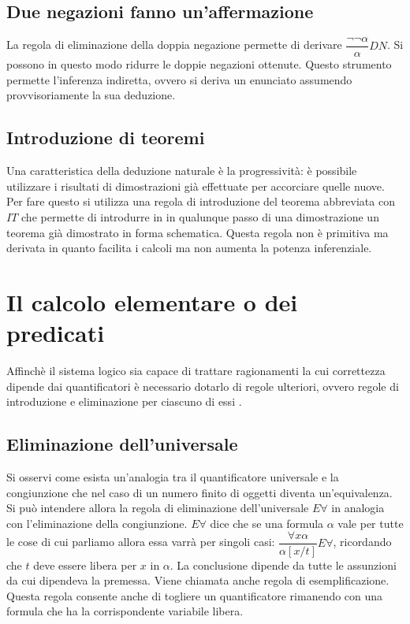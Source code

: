 \subsection{Due negazioni fanno un'affermazione}
La regola di eliminazione della doppia negazione permette di derivare $\dfrac{\neg\neg\alpha}{\alpha}DN$. Si possono in questo modo ridurre le doppie negazioni ottenute. Questo strumento permette 
l'inferenza indiretta, ovvero si deriva un enunciato assumendo provvisoriamente la sua deduzione. 
\subsection{Introduzione di teoremi}
Una caratteristica della deduzione naturale \`e la progressivit\`a: \`e possibile utilizzare i risultati di dimostrazioni gi\`a effettuate per accorciare quelle nuove. Per fare questo si utilizza una regola di introduzione 
del teorema abbreviata con $IT$ che permette di introdurre in in qualunque passo di una dimostrazione un teorema gi\`a dimostrato in forma schematica. Questa regola non \`e primitiva ma derivata in quanto 
facilita i calcoli ma non aumenta la potenza inferenziale. 
\section{Il calcolo elementare o dei predicati}
Affinch\`e il sistema logico sia capace di trattare ragionamenti la cui correttezza dipende dai quantificatori \`e necessario dotarlo di regole ulteriori, ovvero regole di introduzione e eliminazione per ciascuno di 
essi .
\subsection{Eliminazione dell'universale}
Si osservi come esista un'analogia tra il quantificatore universale e la congiunzione che nel caso di un numero finito di oggetti diventa un'equivalenza. Si pu\`o intendere allora la regola di eliminazione 
dell'universale $E\forall$ in analogia con l'eliminazione della congiunzione. $E\forall$ dice che se una formula $\alpha$ vale per tutte le cose di cui parliamo allora essa varr\`a per singoli casi: $\dfrac{\forall 
x\alpha}{\alpha[x/t]}E\forall$, ricordando che $t$ deve essere libera per $x$ in $\alpha$. La conclusione dipende da tutte le assunzioni da cui dipendeva la premessa. Viene chiamata anche regola di 
esemplificazione. Questa regola consente anche di togliere un quantificatore rimanendo con una formula che ha la corrispondente variabile libera.
